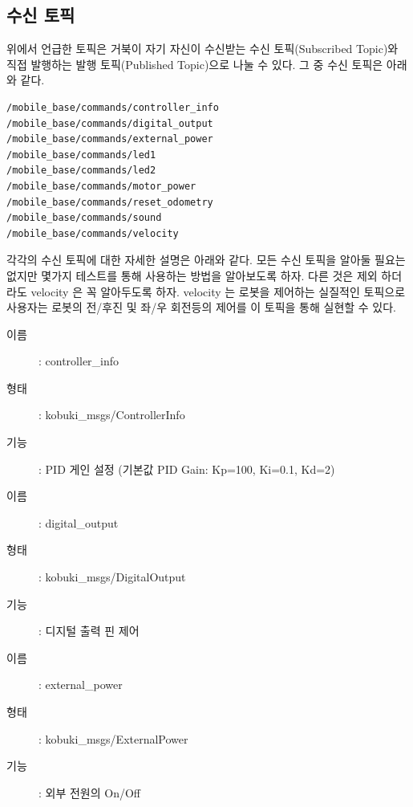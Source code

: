 \subsection{수신 토픽}

위에서 언급한 토픽은 거북이 자기 자신이 수신받는 수신 토픽(Subscribed Topic)와 직접 발행하는 발행 토픽(Published Topic)으로 나눌 수 있다. 그 중 수신 토픽은 아래와 같다.

\begin{lstlisting}[language=ROS]
/mobile_base/commands/controller_info
/mobile_base/commands/digital_output
/mobile_base/commands/external_power
/mobile_base/commands/led1
/mobile_base/commands/led2
/mobile_base/commands/motor_power
/mobile_base/commands/reset_odometry
/mobile_base/commands/sound
/mobile_base/commands/velocity
\end{lstlisting}

각각의 수신 토픽에 대한 자세한 설명은 아래와 같다. 모든 수신 토픽을 알아둘 필요는 없지만 몇가지 테스트를 통해 사용하는 방법을 알아보도록 하자. 다른 것은 제외 하더라도 velocity 은 꼭 알아두도록 하자. velocity 는 로봇을 제어하는 실질적인 토픽으로 사용자는 로봇의 전/후진 및 좌/우 회전등의 제어를 이 토픽을 통해 실현할 수 있다.

\vspace{\baselineskip}
\begin{description}
\item[이름]: controller\_info 
\item[형태]: kobuki\_msgs/ControllerInfo
\item[기능]: PID 게인 설정 (기본값 PID Gain: Kp=100, Ki=0.1, Kd=2)
\end{description}

\vspace{\baselineskip}
\begin{description}
\item[이름]: digital\_output 
\item[형태]: kobuki\_msgs/DigitalOutput
\item[기능]: 디지털 출력 핀 제어
\end{description}

\vspace{\baselineskip}
\begin{description}
\item[이름]: external\_power
\item[형태]: kobuki\_msgs/ExternalPower
\item[기능]: 외부 전원의 On/Off
\end{description}


